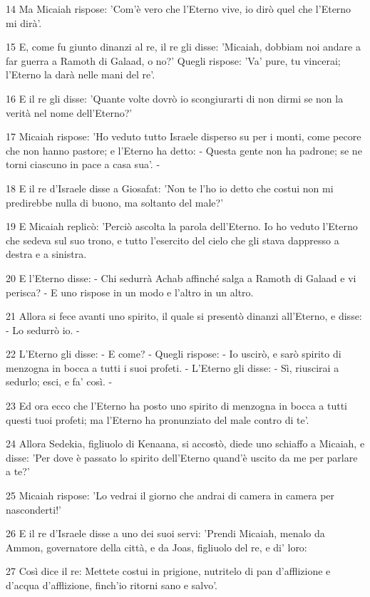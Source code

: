 \par 14 Ma Micaiah rispose: 'Com'è vero che l'Eterno vive, io dirò quel che l'Eterno mi dirà'.
\par 15 E, come fu giunto dinanzi al re, il re gli disse: 'Micaiah, dobbiam noi andare a far guerra a Ramoth di Galaad, o no?' Quegli rispose: 'Va' pure, tu vincerai; l'Eterno la darà nelle mani del re'.
\par 16 E il re gli disse: 'Quante volte dovrò io scongiurarti di non dirmi se non la verità nel nome dell'Eterno?'
\par 17 Micaiah rispose: 'Ho veduto tutto Israele disperso su per i monti, come pecore che non hanno pastore; e l'Eterno ha detto: - Questa gente non ha padrone; se ne torni ciascuno in pace a casa sua'. -
\par 18 E il re d'Israele disse a Giosafat: 'Non te l'ho io detto che costui non mi predirebbe nulla di buono, ma soltanto del male?'
\par 19 E Micaiah replicò: 'Perciò ascolta la parola dell'Eterno. Io ho veduto l'Eterno che sedeva sul suo trono, e tutto l'esercito del cielo che gli stava dappresso a destra e a sinistra.
\par 20 E l'Eterno disse: - Chi sedurrà Achab affinché salga a Ramoth di Galaad e vi perisca? - E uno rispose in un modo e l'altro in un altro.
\par 21 Allora si fece avanti uno spirito, il quale si presentò dinanzi all'Eterno, e disse: - Lo sedurrò io. -
\par 22 L'Eterno gli disse: - E come? - Quegli rispose: - Io uscirò, e sarò spirito di menzogna in bocca a tutti i suoi profeti. - L'Eterno gli disse: - Sì, riuscirai a sedurlo; esci, e fa' così. -
\par 23 Ed ora ecco che l'Eterno ha posto uno spirito di menzogna in bocca a tutti questi tuoi profeti; ma l'Eterno ha pronunziato del male contro di te'.
\par 24 Allora Sedekia, figliuolo di Kenaana, si accostò, diede uno schiaffo a Micaiah, e disse: 'Per dove è passato lo spirito dell'Eterno quand'è uscito da me per parlare a te?'
\par 25 Micaiah rispose: 'Lo vedrai il giorno che andrai di camera in camera per nasconderti!'
\par 26 E il re d'Israele disse a uno dei suoi servi: 'Prendi Micaiah, menalo da Ammon, governatore della città, e da Joas, figliuolo del re, e di' loro:
\par 27 Così dice il re: Mettete costui in prigione, nutritelo di pan d'afflizione e d'acqua d'afflizione, finch'io ritorni sano e salvo'.
